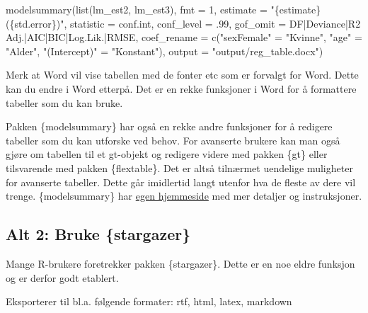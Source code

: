 \documentclass[
  letterpaper,
  DIV=11,
  numbers=noendperiod]{scrreprt}
\newenvironment{Shaded}{\begin{snugshade}}{\end{snugshade}}
\newcommand{\AttributeTok}[1]{\textcolor[rgb]{0.40,0.45,0.13}{#1}}
\newcommand{\DecValTok}[1]{\textcolor[rgb]{0.68,0.00,0.00}{#1}}
\newcommand{\FunctionTok}[1]{\textcolor[rgb]{0.28,0.35,0.67}{#1}}
\newcommand{\NormalTok}[1]{\textcolor[rgb]{0.00,0.23,0.31}{#1}}
\newcommand{\OtherTok}[1]{\textcolor[rgb]{0.00,0.23,0.31}{#1}}
\newcommand{\StringTok}[1]{\textcolor[rgb]{0.13,0.47,0.30}{#1}}
\theoremstyle{definition}
\theoremstyle{remark}
\begin{document}
\begin{Shaded}
\begin{Highlighting}[]
\FunctionTok{modelsummary}\NormalTok{(}\FunctionTok{list}\NormalTok{(lm\_est2, lm\_est3), }
             \AttributeTok{fmt =} \DecValTok{1}\NormalTok{,}
             \AttributeTok{estimate =} \StringTok{"\{estimate\} (\{std.error\})"}\NormalTok{,}
             \AttributeTok{statistic =} \StringTok{\textquotesingle{}conf.int\textquotesingle{}}\NormalTok{, }
             \AttributeTok{conf\_level =}\NormalTok{ .}\DecValTok{99}\NormalTok{, }
             \AttributeTok{gof\_omit =} \StringTok{\textquotesingle{}DF|Deviance|R2 Adj.|AIC|BIC|Log.Lik.|RMSE\textquotesingle{}}\NormalTok{, }
             \AttributeTok{coef\_rename =} \FunctionTok{c}\NormalTok{(}\StringTok{"sexFemale"} \OtherTok{=} \StringTok{"Kvinne"}\NormalTok{, }
                                   \StringTok{"age"} \OtherTok{=} \StringTok{"Alder"}\NormalTok{, }
                                  \StringTok{"(Intercept)"} \OtherTok{=} \StringTok{"Konstant"}\NormalTok{), }
             \AttributeTok{output =} \StringTok{"output/reg\_table.docx"}\NormalTok{)}
\end{Highlighting}
\end{Shaded}

Merk at Word vil vise tabellen med de fonter etc som er forvalgt for
Word. Dette kan du endre i Word etterpå. Det er en rekke funksjoner i
Word for å formattere tabeller som du kan bruke.

Pakken \{modelsummary\} har også en rekke andre funksjoner for å
redigere tabeller som du kan utforske ved behov. For avanserte brukere
kan man også gjøre om tabellen til et gt-objekt og redigere videre med
pakken \{gt\} eller tilsvarende med pakken \{flextable\}. Det er altså
tilnærmet uendelige muligheter for avanserte tabeller. Dette går
imidlertid langt utenfor hva de fleste av dere vil trenge.
\{modelsummary\} har
\href{https://vincentarelbundock.github.io/modelsummary/index.html}{egen
hjemmeside} med mer detaljer og instruksjoner.

\hypertarget{alt-2-bruke-stargazer}{%
\subsection{Alt 2: Bruke \{stargazer\}}\label{alt-2-bruke-stargazer}}

Mange R-brukere foretrekker pakken \{stargazer\}. Dette er en noe eldre
funksjon og er derfor godt etablert.

Eksporterer til bl.a. følgende formater: rtf, html, latex, markdown
\end{document}
